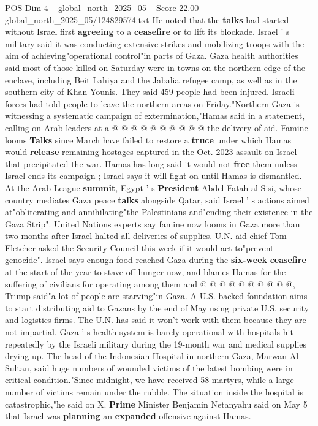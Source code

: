 \begin{textsample}{POS Dim 4 – global\_north\_2025\_05 – Score 22.00 – global\_north\_2025\_05/124829574.txt}
He noted that the \textbf{talks} had started without Israel first \textbf{agreeing} to a \textbf{ceasefire} or to lift its blockade.
Israel ' s military said it was conducting extensive strikes and mobilizing troops with the aim of achieving"operational control"in parts of Gaza.
Gaza health authorities said most of those killed on Saturday were in towns on the northern edge of the enclave, including Beit Lahiya and the Jabalia refugee camp, as well as in the southern city of Khan Younis.
They said 459 people had been injured.
Israeli forces had told people to leave the northern areas on Friday."Northern Gaza is witnessing a systematic campaign of extermination,"Hamas said in a statement, calling on Arab leaders at a @ @ @ @ @ @ @ @ @ @ the delivery of aid.
Famine looms \textbf{Talks} since March have failed to restore a \textbf{truce} under which Hamas would \textbf{release} remaining hostages captured in the Oct. 2023 assault on Israel that precipitated the war.
Hamas has long said it would not \textbf{free} them unless Israel ends its campaign ; Israel says it will fight on until Hamas is dismantled.
At the Arab League \textbf{summit}, Egypt ' s \textbf{President} Abdel-Fatah al-Sisi, whose country mediates Gaza peace \textbf{talks} alongside Qatar, said Israel ' s actions aimed at"obliterating and annihilating"the Palestinians and"ending their existence in the Gaza Strip".
United Nations experts say famine now looms in Gaza more than two months after Israel halted all deliveries of supplies.
U.N. aid chief Tom Fletcher asked the Security Council this week if it would act to"prevent genocide".
Israel says enough food reached Gaza during the \textbf{six-week} \textbf{ceasefire} at the start of the year to stave off hunger now, and blames Hamas for the suffering of civilians for operating among them and @ @ @ @ @ @ @ @ @ @, Trump said"a lot of people are starving"in Gaza.
A U.S.-backed foundation aims to start distributing aid to Gazans by the end of May using private U.S. security and logistics firms.
The U.N. has said it won't work with them because they are not impartial.
Gaza ' s health system is barely operational with hospitals hit repeatedly by the Israeli military during the 19-month war and medical supplies drying up.
The head of the Indonesian Hospital in northern Gaza, Marwan Al-Sultan, said huge numbers of wounded victims of the latest bombing were in critical condition."Since midnight, we have received 58 martyrs, while a large number of victims remain under the rubble.
The situation inside the hospital is catastrophic,"he said on X. \textbf{Prime} Minister Benjamin Netanyahu said on May 5 that Israel was \textbf{planning} an \textbf{expanded} offensive against Hamas.

\end{textsample}
